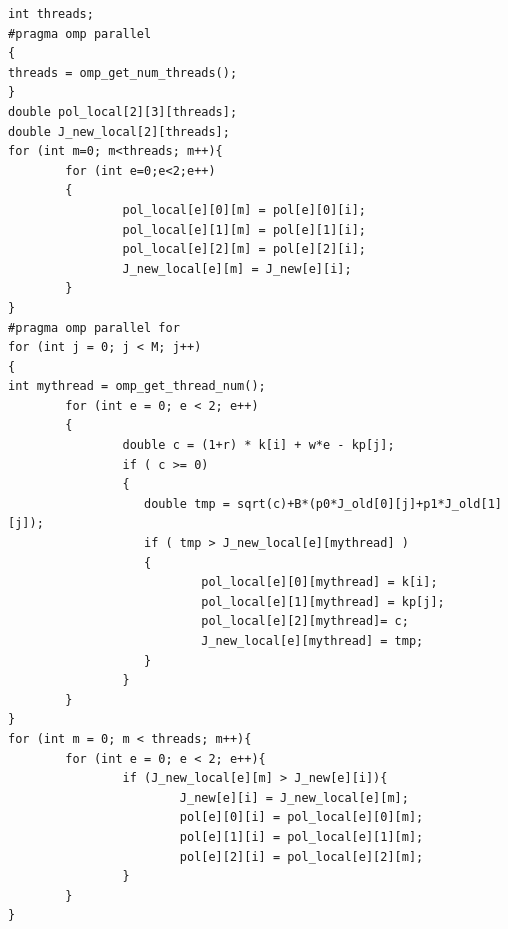 \documentclass[12pt]{article}
\begin{document}
\begin{lstlisting}[caption=Race condition workaround, label={lst:L3}]
int threads;
#pragma omp parallel
{
threads = omp_get_num_threads();
}
double pol_local[2][3][threads];
double J_new_local[2][threads];
for (int m=0; m<threads; m++){
        for (int e=0;e<2;e++)
        {
                pol_local[e][0][m] = pol[e][0][i];
                pol_local[e][1][m] = pol[e][1][i];
                pol_local[e][2][m] = pol[e][2][i];
                J_new_local[e][m] = J_new[e][i];
        }
}
#pragma omp parallel for 
for (int j = 0; j < M; j++)
{
int mythread = omp_get_thread_num();
        for (int e = 0; e < 2; e++)
        {
                double c = (1+r) * k[i] + w*e - kp[j];
                if ( c >= 0)
                {
                   double tmp = sqrt(c)+B*(p0*J_old[0][j]+p1*J_old[1][j]);
                   if ( tmp > J_new_local[e][mythread] )
                   {
                           pol_local[e][0][mythread] = k[i];
                           pol_local[e][1][mythread] = kp[j];
                           pol_local[e][2][mythread]= c;
                           J_new_local[e][mythread] = tmp;
                   }
                }
        }
}
for (int m = 0; m < threads; m++){
        for (int e = 0; e < 2; e++){
                if (J_new_local[e][m] > J_new[e][i]){
                        J_new[e][i] = J_new_local[e][m];
                        pol[e][0][i] = pol_local[e][0][m];
                        pol[e][1][i] = pol_local[e][1][m];
                        pol[e][2][i] = pol_local[e][2][m];
                }
        }
}
\end{lstlisting}
\end{document}

